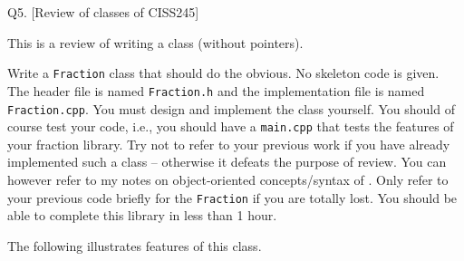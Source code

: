 \newpage
Q5. [Review of classes of CISS245]

This is a review of writing a class (without pointers).

Write a \texttt{Fraction} class that should do the obvious.
No skeleton code is given.
The header file is named \texttt{Fraction.h}
and the implementation file is named \texttt{Fraction.cpp}.
You must design and implement the class yourself.
You should of course test your code, i.e., you should have a
\verb!main.cpp! that tests the features of your fraction library.
Try not to refer to your previous work if you have already implemented
such a class -- otherwise it defeats the purpose of review.
You can however refer to my notes on object-oriented
concepts/syntax of \cpp.
Only refer to your previous code briefly for the \verb!Fraction! if you are
totally lost.
You should be able to complete this library in less than 1 hour.

The following illustrates features of this class.

